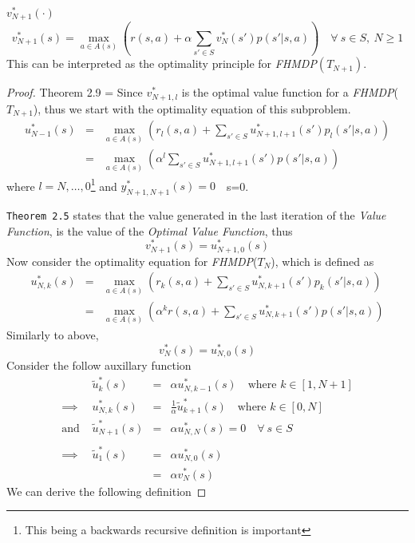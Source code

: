 \documentclass[11pt,a4paper]{article}
\begin{document}
  \begin{theorem}{$v_{N+1}^*(\cdot)$}
    \[ v_{N+1}^*(s)=\max_{a\in A(s)}\left(r(s,a)+\alpha\sum_{s'\in S}v_N^*(s')p(s'|s,a)\right)\quad\forall\ s\in S,\ N\geq1 \]
    This can be interpreted as the optimality principle for \textit{FHMDP}$(T_{N+1})$.
  \end{theorem}

  \begin{proof}{Theorem 2.9}
    \everymath={\displaystyle}
    Since $v_{N+1,l}^*$ is the optimal value function for a \textit{FHMDP}($T_{N+1}$), thus we start with the optimality equation of this subproblem.
    \[\begin{array}{rcl}
      u_{N-1}^*(s)&=&\max_{a\in A(s)}\left(r_l(s,a)+\sum_{s'\in S}u_{N+1,l+1}^*(s')p_l(s'|s,a)\right)\\
      &=&\max_{a\in A(s)}\left(\alpha^l\sum_{s'\in S}u_{N+1,l+1}^*(s')p(s'|s,a)\right)
    \end{array}\]
    where $l=N,\dots,0$\footnote{This being a backwards recursive definition is important} and $y_{N+1,N+1}^*(s)=0$\ \forall\ s=0.
    \par \texttt{Theorem 2.5} states that the value generated in the last iteration of the \textit{Value Function}, is the value of the \textit{Optimal Value Function}, thus
    \[ v_{N+1}^*(s)=u_{N+1,0}^*(s) \]
    Now consider the optimality equation for \textit{FHMDP}($T_N$), which is defined as
    \[\begin{array}{rcl}
      u_{N,k}^*(s)&=&\max_{a\in A(s)}\left(r_k(s,a)+\sum_{s'\in S}u_{N,k+1}^*(s')p_k(s'|s,a)\right)\\
      &=&\max_{a\in A(s)}\left(\alpha^kr(s,a)+\sum_{s'\in S}u_{N,k+1}^*(s')p(s'|s,a)\right)
    \end{array}\]
    Similarly to above,
    \[ v_N^*(s)=u_{N,0}^*(s) \]
    Consider the follow auxillary function
    \[\begin{array}{rrrl}
      &\tilde{u}_k^*(s)&=&\alpha u_{N,k-1}^*(s)\quad\text{where }k\in[1,N+1 ]\\
      \implies &u_{N,k}^*(s)&=&\frac1\alpha\tilde{u}_{k+1}^*(s)\quad\text{where }k\in[0,N ]\\
      \text{and }&\tilde{u}_{N+1}^*(s)&=&\alpha u_{N,N}^*(s)=0\quad\forall\ s\in S\\\\
      \implies&\tilde{u}_1^*(s)&=&\alpha u_{N,0}^*(s)\\
      &&=&\alpha v_N^*(s)
    \end{array}\]
    We can derive the following definition

\end{proof}
\end{document}
